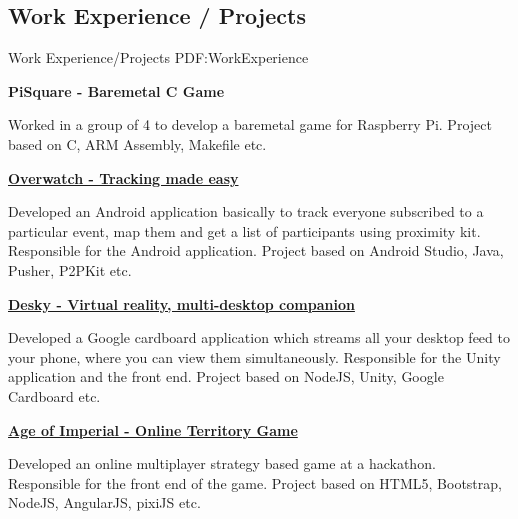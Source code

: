 \documentclass[letterpaper,10pt,oneside]{article}
\begin{document}
\begin{body}

\section
{Work Experience / Projects}
{Work Experience/Projects}
{PDF:WorkExperience}

\BulletItem
\textbf{PiSquare - Baremetal C Game}
\hfill
{}
\begin{detail}
\GapNoBreak
\SubBulletItem
Worked in a group of 4 to develop a baremetal game for Raspberry Pi.
\SubBulletItem
Project based on C, ARM Assembly, Makefile etc.
\end{detail}

\GapNoBreak

\BulletItem
\href{https://github.com/SomeRandomTeam/}
{\textbf{Overwatch - Tracking made easy}}
\hfill
{}
\begin{detail}
\GapNoBreak
\SubBulletItem
Developed an Android application basically to track everyone subscribed to a
particular event, map them and get a list of participants using proximity kit.
\SubBulletItem
Responsible for the Android application.
\SubBulletItem
Project based on Android Studio, Java, Pusher, P2PKit etc.
\end{detail}

\GapNoBreak

\BulletItem
\href{https://github.com/SomeRandomTeam/}
{\textbf{Desky - Virtual reality, multi-desktop companion}}
\hfill
{}
\begin{detail}
\GapNoBreak
\SubBulletItem
Developed a Google cardboard application which streams all your desktop feed
to your phone, where you can view them simultaneously.
\SubBulletItem
Responsible for the Unity application and the front end.
\SubBulletItem
Project based on NodeJS, Unity, Google Cardboard etc.
\end{detail}

\GapNoBreak

\BulletItem
\href{https://github.com/SomeRandomTeam/hackatbrookes2016}
{\textbf{Age of Imperial - Online Territory Game}}
\hfill
{}
\begin{detail}
\GapNoBreak
\SubBulletItem
Developed an online multiplayer strategy based game at a hackathon.
\SubBulletItem
Responsible for the front end of the game.
\SubBulletItem
Project based on HTML5, Bootstrap, NodeJS, AngularJS, pixiJS etc.
\end{detail}


\end{body}
\end{document}
